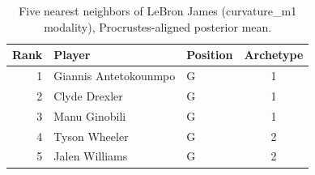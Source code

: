 \begin{table}[htbp]
  \centering\small
  \begin{tabular}{rllc}
    \toprule
    Rank & Player & Position & Archetype \\
    \midrule
    1 & Giannis Antetokounmpo & G & 1 \\
    2 & Clyde Drexler & G & 1 \\
    3 & Manu Ginobili & G & 1 \\
    4 & Tyson Wheeler & G & 2 \\
    5 & Jalen Williams & G & 2 \\
    \bottomrule
  \end{tabular}
  \caption{Five nearest neighbors of LeBron James (curvature_m1 modality), Procrustes-aligned posterior mean.}
  \label{tab:LeBron_James_neighbors_curvature_m1}
\end{table}

